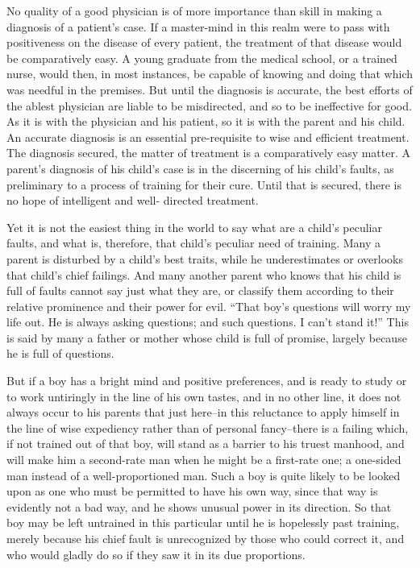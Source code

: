 \documentclass[
]{book}
\begin{document}
No quality of a good physician is of more importance than skill in making a diagnosis of a patient's case. If a master-mind in this realm were to pass with positiveness on the disease of every patient, the treatment of that disease would be comparatively easy. A young graduate from the medical school, or a trained nurse, would then, in most instances, be capable of knowing and doing that which was needful in the premises. But until the diagnosis is accurate, the best efforts of the ablest physician are liable to be misdirected, and so to be ineffective for good. As it is with the physician and his patient, so it is with the parent and his child. An accurate diagnosis is an essential pre-requisite to wise and efficient treatment. The diagnosis secured, the matter of treatment is a comparatively easy matter. A parent's diagnosis of his child's case is in the discerning of his child's faults, as preliminary to a process of training for their cure. Until that is secured, there is no hope of intelligent and well- directed treatment.

Yet it is not the easiest thing in the world to say what are a child's peculiar faults, and what is, therefore, that child's peculiar need of training. Many a parent is disturbed by a child's best traits, while he underestimates or overlooks that child's chief failings. And many another parent who knows that his child is full of faults cannot say just what they are, or classify them according to their relative prominence and their power for evil. ``That boy's questions will worry my life out. He is always asking questions; and such questions. I can't stand it!'' This is said by many a father or mother whose child is full of promise, largely because he is full of questions.

But if a boy has a bright mind and positive preferences, and is ready to study or to work untiringly in the line of his own tastes, and in no other line, it does not always occur to his parents that just here--in this reluctance to apply himself in the line of wise expediency rather than of personal fancy--there is a failing which, if not trained out of that boy, will stand as a barrier to his truest manhood, and will make him a second-rate man when he might be a first-rate one; a one-sided man instead of a well-proportioned man. Such a boy is quite likely to be looked upon as one who must be permitted to have his own way, since that way is evidently not a bad way, and he shows unusual power in its direction. So that boy may be left untrained in this particular until he is hopelessly past training, merely because his chief fault is unrecognized by those who could correct it, and who would gladly do so if they saw it in its due proportions.
\end{document}
